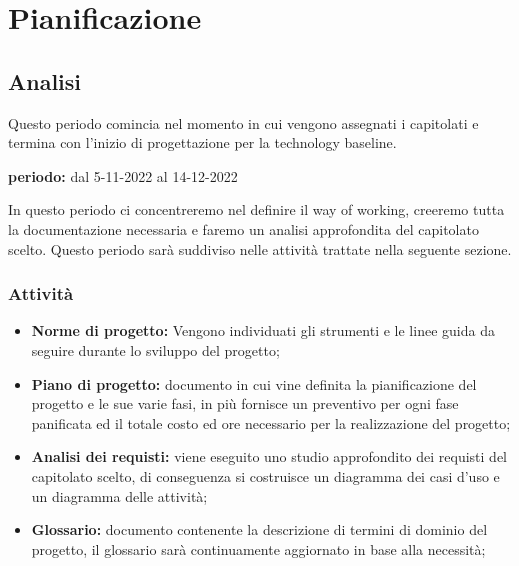 \section{Pianificazione}
\subsection{Analisi}
Questo periodo comincia nel momento in cui vengono assegnati i capitolati e termina con l'inizio di progettazione per la technology baseline.\\
\begin{center}
\textbf{periodo:} dal 5-11-2022 al 14-12-2022\\
\end{center}
In questo periodo ci concentreremo nel definire il way of working, creeremo tutta la documentazione necessaria e faremo un analisi approfondita del capitolato scelto.  Questo periodo sarà suddiviso nelle attività trattate nella seguente sezione.
\subsubsection{Attività}
\begin{itemize}
\item \textbf{Norme di progetto:} Vengono individuati gli strumenti e le linee guida da seguire durante lo sviluppo del progetto;
\item \textbf{Piano di progetto:} documento in cui vine definita la pianificazione del progetto e le sue varie fasi,  in più fornisce un preventivo per ogni fase panificata ed il totale costo ed ore necessario per la realizzazione del progetto;
\item \textbf{Analisi dei requisti:} viene eseguito uno studio approfondito dei requisti del capitolato scelto,  di conseguenza si costruisce un diagramma dei casi d'uso e un diagramma delle attività;
\item \textbf{Glossario: } documento contenente la descrizione di termini di dominio del progetto, il glossario sarà continuamente aggiornato in base alla necessità;
\end{itemize}

